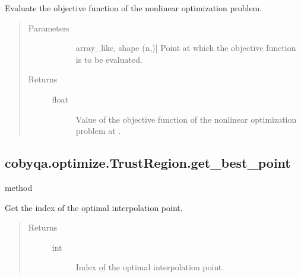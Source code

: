 \documentclass[letterpaper,10pt,english]{sphinxmanual}
\begin{document}
\begin{fulllineitems}
\begin{fulllineitems}
\label{\detokenize{refs/generated/cobyqa.optimize.TrustRegion.fun:cobyqa.optimize.TrustRegion.fun}}
\sphinxAtStartPar
Evaluate the objective function of the nonlinear optimization problem.
\begin{quote}\begin{description}
\item[{Parameters}] \leavevmode\begin{description}
\item[{}] \leavevmode{[}array\_like, shape (n,){]}
\sphinxAtStartPar
Point at which the objective function is to be evaluated.

\end{description}

\item[{Returns}] \leavevmode\begin{description}
\item[{float}] \leavevmode
\sphinxAtStartPar
Value of the objective function of the nonlinear optimization
problem at .

\end{description}

\end{description}\end{quote}

\end{fulllineitems}



\subsection{cobyqa.optimize.TrustRegion.get\_best\_point}
\label{\detokenize{refs/generated/cobyqa.optimize.TrustRegion.get_best_point:cobyqa-optimize-trustregion-get-best-point}}\label{\detokenize{refs/generated/cobyqa.optimize.TrustRegion.get_best_point::doc}}
\sphinxAtStartPar
method

\begin{fulllineitems}
\label{\detokenize{refs/generated/cobyqa.optimize.TrustRegion.get_best_point:cobyqa.optimize.TrustRegion.get_best_point}}
\sphinxAtStartPar
Get the index of the optimal interpolation point.
\begin{quote}\begin{description}
\item[{Returns}] \leavevmode\begin{description}
\item[{int}] \leavevmode
\sphinxAtStartPar
Index of the optimal interpolation point.


\end{description}
\end{description}
\end{quote}
\end{fulllineitems}
\end{fulllineitems}
\end{document}
